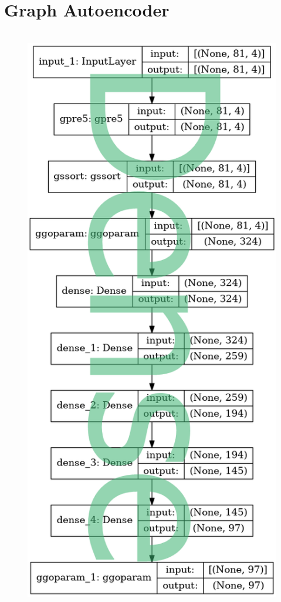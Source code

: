 \documentclass[hyperref={pdfpagelabels=false}]{beamer}
\begin{document}
\newpage
\section{Graph Autoencoder}\label{sec:Graph Autoencoder}

\begin{frame}[label=]
\frametitle{}
\begin{columns}[c] %
\begin{column}{0.48\textwidth}%
\begin{figure}[H] 
  \centering
\includegraphics[height=0.9\textheight]{../imgs/xdenseencode.png}
\label{fig:xdenseencodepng}
  \end{figure}



\end{column}
\end{columns}
\end{frame}
\end{document}
